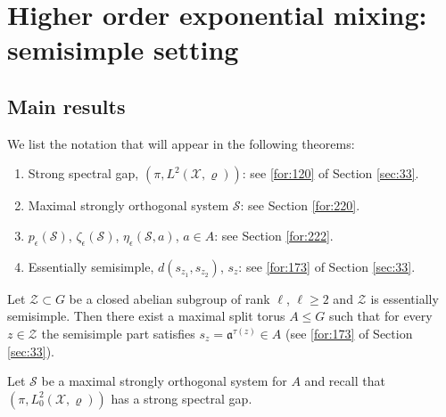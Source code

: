 \documentclass[11 pt]{amsart}
\theoremstyle{definition}
\numberwithin{equation}{section}
\begin{document}
\section{Higher order exponential mixing: semisimple setting}
\subsection{Main results} We list  the notation that will appear in the following theorems:
\begin{enumerate}


  \item Strong spectral gap, $(\pi, L^2(\mathcal X,\varrho))$:  see \eqref{for:120} of Section \ref{sec:33}.


  \item Maximal strongly orthogonal system $\mathcal{S}$: see Section \ref{for:220}.
  \item $p_{\epsilon}(\mathcal{S})$, $\zeta_{\epsilon}(\mathcal{S})$, $\eta_\epsilon(\mathcal{S}, a)$, $a\in A$: see Section \ref{for:222}.

  \item Essentially semisimple, $d(s_{z_1},s_{z_2})$, $s_z$: see  \eqref{for:173} of Section \ref{sec:33}.



\end{enumerate}



 Let $\mathcal Z\subset G$ be a closed abelian subgroup of rank $\ell$, $\ell\geq2$ and $\mathcal Z$ is essentially semisimple.
Then there exist a maximal split torus $A\le G$
such that for every $z\in\mathcal Z$ the semisimple part satisfies $s_z=\mathfrak{a}^{\tau(z)}\in A$ (see  \eqref{for:173} of Section \ref{sec:33}).

Let $\mathcal S$ be a maximal strongly orthogonal system for $A$ and recall that $(\pi, L_0^2(\mathcal X,\varrho))$ has a strong spectral gap.
\end{document}
